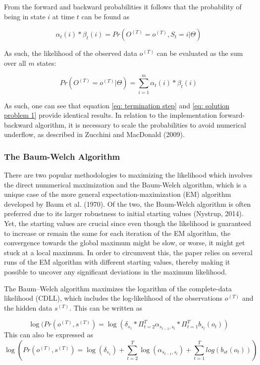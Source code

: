 From the forward and backward probabilities it follows that the probability of being in state $i$ at time $t$ can be found as

\begin{equation}
    \alpha_t(i) * \beta_t(i) = Pr(O^{(T)} = o^{(T)}, S_t = i |\Theta)
\end{equation}

As such, the likelihood of the observed data $o^{(T)}$ can be evaluated as the sum over all $m$ states:

\begin{equation}
    Pr(O^{(T)} = o^{(T)} | \Theta) = \sum_{i=1}^m \alpha_t(i) * \beta_t(i)
    \label{eq: solution problem 1}
\end{equation}

As such, one can see that equation \ref{eq: termination step} and \ref{eq: solution problem 1} provide identical results. In relation to the implementation forward-backward algorithm, it is necessary to scale the probabilities to avoid numerical
underflow, as described in Zucchini and MacDonald (2009). 

\subsubsection{The Baum-Welch Algorithm}
There are two popular methodologies to maximizing the likelihood which involves the direct nummerical maximization and the Baum-Welch algorithm, which is a unique case of the more general expectation-maximization (EM) algorithm developed by Baum et al. (1970). Of the two, the Baum-Welch algorithm is often preferred due to its larger robustness to initial starting values (Nystrup, 2014). Yet, the starting values are crucial since even though the likelihood is guaranteed to increase or remain the same for each iteration of the EM algorithm, the convergence towards the global maximum might be slow, or worse, it might get stuck at a local maximum. In order to circumvent this, the paper relies on several runs of the EM algorithm with different starting values, thereby making it possible to uncover any significant deviations in the maximum likelihood. 

The Baum–Welch algorithm maximizes the logarithm of the complete-data likelihood (CDLL), which includes the log-likelihood of the observations $o^{(T)}$ and the hidden data $s^{(T)}$. This can be written as

\begin{equation}
    \log(Pr(o^{(T)},s^{(T)}) = \log(\delta_{s_1} * \Pi_{t=2}^T \alpha_{s_{t-1},s_t} * \Pi_{t=1}^T b_{s_t}(o_t)) 
\end{equation}
This can also be expressed as
\begin{equation}
    \log(Pr(o^{(T)},s^{(T)}) = \log(\delta_{s_1}) + \sum_{t=2}^T \log(\alpha_{s_{t-1},s_t})+\sum_{t=1}^T log(b_{st}(o_t)))
\end{equation}

